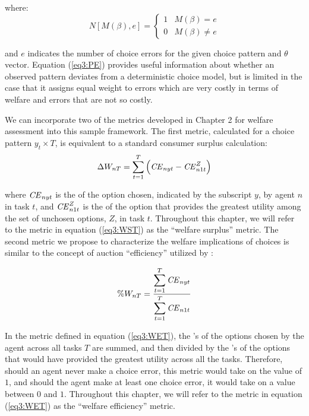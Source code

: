 \documentclass[../main.tex]{subfiles}
\begin{document}
\noindent where:
\begin{equation}
	\label{eq3:NMB}
	N[M(\beta), e] = 
	\begin{cases}
		1 & M(\beta) = e\\
		0 & M(\beta) \neq e
	\end{cases}
\end{equation}

\noindent and $e$ indicates the number of choice errors for the given choice pattern and $\theta$ vector.
Equation (\ref{eq3:PE}) provides useful information about whether an observed pattern deviates from a deterministic choice model, but is limited in the case that it assigns equal weight to errors which are very costly in terms of welfare and errors that are not so costly.

We can incorporate two of the metrics developed in Chapter 2 for welfare assessment into this sample framework.
The first metric, calculated for a choice pattern $y_t \times T$, is equivalent to a standard consumer surplus calculation:
\begin{equation}
	\label{eq3:WST}
	\Delta W_{nT} = \sum_{t=1}^T \left( {\mathit{CE}}_{nyt} - {\mathit{CE}}_{n1t}^Z \right)
\end{equation}

\noindent where ${\mathit{CE}}_{nyt}$ is the {\CE} of the option chosen, indicated by the subscript $y$, by agent $n$ in task $t$, and ${\mathit{CE}}_{n1t}^Z$ is the {\CE} of the option that provides the greatest utility among the set of unchosen options, $Z$, in task $t$.
Throughout this chapter, we will refer to the metric in equation (\ref{eq3:WST}) as the \enquote{welfare surplus} metric.
The second metric we propose to characterize the welfare implications of choices is similar to the concept of auction \enquote{efficiency} utilized by \textcite{Plott1978}:

\begin{equation}
	\label{eq3:WET}
	\%W_{nT} = \frac{\displaystyle\sum_{t=1}^{T} {\mathit{CE}}_{nyt} }{\displaystyle\sum_{t=1}^{T} {\mathit{CE}}_{n1t}}
\end{equation}

\noindent In the metric defined in equation (\ref{eq3:WET}), the {\CE}'s of the options chosen by the agent across all tasks $T$ are summed, and then divided by the {\CE}'s of the options that would have provided the greatest utility across all the tasks.
Therefore, should an agent never make a choice error, this metric would take on the value of $1$, and should the agent make at least one choice error, it would take on a value between $0$ and $1$.{\footnotemark}
Throughout this chapter, we will refer to the metric in equation (\ref{eq3:WET}) as the \enquote{welfare efficiency} metric.
\end{document}
